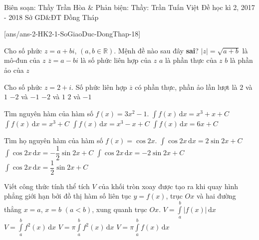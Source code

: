 
\begin{name}
{Biên soạn: Thầy Trần Hòa \& Phản biện: Thầy: Trần Tuấn Việt}
{Đề học kì 2, 2017 - 2018 Sở GD\&ĐT Đồng Tháp}
\end{name}
\setcounter{ex}{0}\setcounter{bt}{0}
[ans/ans-2-HK2-1-SoGiaoDuc-DongThap-18]
\begin{ex}%
Cho số phức $z=a+bi$, $(a,b \in\mathbb{R})$. Mệnh đề nào sau đây {\bf sai}?
\choice
{\True $|z|=\sqrt{a+b}$ là mô-đun của $z$}
{$\overline{z} = a-bi$ là số phức liên hợp của $z$} 
{$a$ là phần thực của $z$}
{$b$ là phần ảo của $z$}
\end{ex}
\begin{ex}%
Cho số phức $z=2+i$. Số phức liên hợp $\overline{z}$ có phần thực, phần ảo lần lượt là
\choice
{$2$ và $1$}
{$-2$ và $-1$}
{$-2$ và $1$}
{\True $2$ và $-1$}
\end{ex}
\begin{ex}%
Tìm nguyên hàm của hàm số $f(x)=3x^2-1$.
\choice
{$\displaystyle \int f(x) \mathrm{\, d}x = x^3+x+C$}
{$\displaystyle \int f(x) \mathrm{\, d}x = x^3+C$}
{\True $\displaystyle \int  f(x) \mathrm{\, d}x = x^3-x+C$}
{$\displaystyle \int f(x) \mathrm{\, d}x = 6x+C$}
\end{ex}
\begin{ex}%
Tìm họ nguyên hàm của hàm số $f(x)=\cos2x$.
\choice
{$\displaystyle \int \cos 2x \mathrm{\, d}x = 2\sin2x +C$}
{$\displaystyle \int \cos 2x \mathrm{\, d}x = -\dfrac{1}{2} \sin2x +C$}
{$\displaystyle \int \cos 2x \mathrm{\, d}x = -2\sin2x +C$}
{\True $\displaystyle \int \cos 2x \mathrm{\, d}x = \dfrac{1}{2} \sin2x +C$}
\end{ex}
\begin{ex}%
Viết công thức tính thể tích $V$ của khối tròn xoay được tạo ra khi quay hình phẳng giới hạn bởi đồ thị hàm số liên tục $y=f(x)$, trục $Ox$ và hai đường thẳng $x=a$, $x=b$ $(a<b)$, xung quanh trục $Ox$.
\choice
{$V=\displaystyle \int \limits_a^b |f(x)|\mathrm{\, d}x$}
{$V=\displaystyle \int \limits_a^b {f^2}(x)\mathrm{\, d}x$}
{\True $V=\displaystyle \pi \int \limits_a^b {f^2}(x)\mathrm{\, d}x$}
{$V=\displaystyle \pi \int \limits_a^b f(x)\mathrm{\, d}x$}
\end{ex}

